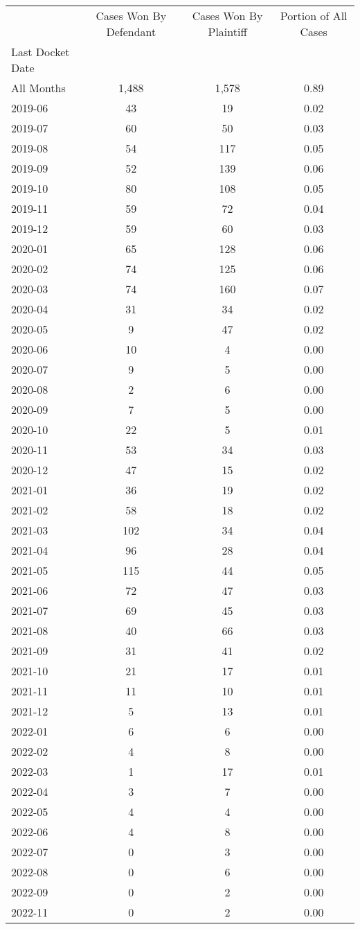 \begin{tabular}{lccc}
\toprule
 & Cases Won By Defendant & Cases Won By Plaintiff & Portion of All Cases \\
Last Docket Date &  &  &  \\
\midrule
All Months & 1,488 & 1,578 & 0.89 \\
2019-06 & 43 & 19 & 0.02 \\
2019-07 & 60 & 50 & 0.03 \\
2019-08 & 54 & 117 & 0.05 \\
2019-09 & 52 & 139 & 0.06 \\
2019-10 & 80 & 108 & 0.05 \\
2019-11 & 59 & 72 & 0.04 \\
2019-12 & 59 & 60 & 0.03 \\
2020-01 & 65 & 128 & 0.06 \\
2020-02 & 74 & 125 & 0.06 \\
2020-03 & 74 & 160 & 0.07 \\
2020-04 & 31 & 34 & 0.02 \\
2020-05 & 9 & 47 & 0.02 \\
2020-06 & 10 & 4 & 0.00 \\
2020-07 & 9 & 5 & 0.00 \\
2020-08 & 2 & 6 & 0.00 \\
2020-09 & 7 & 5 & 0.00 \\
2020-10 & 22 & 5 & 0.01 \\
2020-11 & 53 & 34 & 0.03 \\
2020-12 & 47 & 15 & 0.02 \\
2021-01 & 36 & 19 & 0.02 \\
2021-02 & 58 & 18 & 0.02 \\
2021-03 & 102 & 34 & 0.04 \\
2021-04 & 96 & 28 & 0.04 \\
2021-05 & 115 & 44 & 0.05 \\
2021-06 & 72 & 47 & 0.03 \\
2021-07 & 69 & 45 & 0.03 \\
2021-08 & 40 & 66 & 0.03 \\
2021-09 & 31 & 41 & 0.02 \\
2021-10 & 21 & 17 & 0.01 \\
2021-11 & 11 & 10 & 0.01 \\
2021-12 & 5 & 13 & 0.01 \\
2022-01 & 6 & 6 & 0.00 \\
2022-02 & 4 & 8 & 0.00 \\
2022-03 & 1 & 17 & 0.01 \\
2022-04 & 3 & 7 & 0.00 \\
2022-05 & 4 & 4 & 0.00 \\
2022-06 & 4 & 8 & 0.00 \\
2022-07 & 0 & 3 & 0.00 \\
2022-08 & 0 & 6 & 0.00 \\
2022-09 & 0 & 2 & 0.00 \\
2022-11 & 0 & 2 & 0.00 \\
\bottomrule
\end{tabular}
